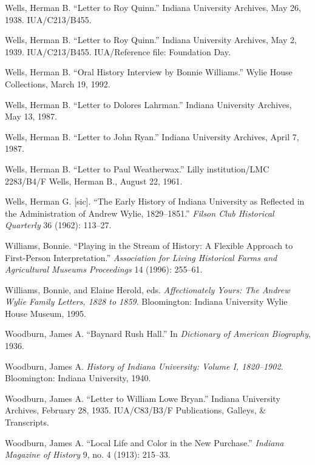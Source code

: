 \documentclass[
  american,
  letterpaper,
]{scrreprt}
\newlength{\cslhangindent}
\newenvironment{CSLReferences}[2] %
 {\begin{list}{}{%
  \setlength{\itemindent}{0pt}
  \setlength{\leftmargin}{0pt}
  \setlength{\parsep}{0pt}
  \ifodd #1
   \setlength{\leftmargin}{\cslhangindent}
   \setlength{\itemindent}{-1\cslhangindent}
  \fi
  \setlength{\itemsep}{#2\baselineskip}}}
 {\end{list}}
\begin{document}
\begin{CSLReferences}{1}{0}
Wells, Herman B. {``Letter to Roy Quinn.''} Indiana University Archives,
May 26, 1938. IUA/C213/B455.

Wells, Herman B. {``Letter to Roy Quinn.''} Indiana University Archives,
May 2, 1939. IUA/C213/B455. IUA/Reference file: Foundation Day.

Wells, Herman B. {``Oral History Interview by Bonnie Williams.''} Wylie
House Collections, March 19, 1992.

Wells, Herman B. {``Letter to Dolores Lahrman.''} Indiana University
Archives, May 13, 1987.

Wells, Herman B. {``Letter to John Ryan.''} Indiana University Archives,
April 7, 1987.

Wells, Herman B. {``Letter to Paul Weatherwax.''} Lilly institution/LMC
2283/B4/F Wells, Herman B., August 22, 1961.

Wells, Herman G. {[}sic{]}. {``The Early History of Indiana University
as Reflected in the Administration of Andrew Wylie, 1829--1851.''}
\emph{Filson Club Historical Quarterly} 36 (1962): 113--27.

Williams, Bonnie. {``Playing in the Stream of History: A Flexible
Approach to First-Person Interpretation.''} \emph{Association for Living
Historical Farms and Agricultural Museums Proceedings} 14 (1996):
255--61.

Williams, Bonnie, and Elaine Herold, eds. \emph{Affectionately Yours:
The Andrew Wylie Family Letters, 1828 to 1859}. Bloomington: Indiana
University Wylie House Museum, 1995.

Woodburn, James A. {``Baynard Rush Hall.''} In \emph{Dictionary of
American Biography}, 1936.

Woodburn, James A. \emph{History of Indiana University: Volume {I},
1820--1902}. Bloomington: Indiana University, 1940.

Woodburn, James A. {``Letter to William Lowe Bryan.''} Indiana
University Archives, February 28, 1935. IUA/C83/B3/F Publications,
Galleys, \& Transcripts.

Woodburn, James A. {``Local Life and Color in the New Purchase.''}
\emph{Indiana Magazine of History} 9, no. 4 (1913): 215--33.


\end{CSLReferences}
\end{document}
